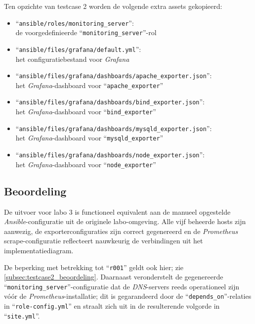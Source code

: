 Ten opzichte van testcase 2 worden de volgende extra assets gekopieerd:

\begin{itemize}
    \item ``\texttt{ansible/roles/monitoring\_server}'': \\de voorgedefinieerde ``\texttt{monitoring\_server}''-rol
    \item ``\texttt{ansible/files/grafana/default.yml}'': \\het configuratiebestand voor \emph{Grafana}
    \item ``\texttt{ansible/files/grafana/dashboards/apache\_exporter.json}'': \\het \emph{Grafana}-dashboard voor ``\texttt{apache\_exporter}''
    \item ``\texttt{ansible/files/grafana/dashboards/bind\_exporter.json}'': \\het \emph{Grafana}-dashboard voor ``\texttt{bind\_exporter}''
    \item ``\texttt{ansible/files/grafana/dashboards/mysqld\_exporter.json}'': \\het \emph{Grafana}-dashboard voor ``\texttt{mysqld\_exporter}''
    \item ``\texttt{ansible/files/grafana/dashboards/node\_exporter.json}'': \\het \emph{Grafana}-dashboard voor ``\texttt{node\_exporter}''
\end{itemize}

\subsection{Beoordeling}%
\label{subsec:testcase3_beoordeling}

De uitvoer voor labo 3 is functioneel equivalent aan de manueel opgestelde \emph{Ansible}-configuratie uit de originele labo-omgeving. Alle vijf beheerde hosts zijn aanwezig, de exporterconfiguraties zijn correct gegenereerd en de \emph{Prometheus} scrape-configuratie reflecteert nauwkeurig de verbindingen uit het implementatiediagram.

De beperking met betrekking tot ``\texttt{r001}'' geldt ook hier; zie \autoref{subsec:testcase2_beoordeling}. Daarnaast veronderstelt de gegenereerde ``\texttt{monitoring\_server}''-configuratie dat de \emph{DNS}-servers reeds operationeel zijn vóór de \emph{Prometheus}-installatie; dit is gegarandeerd door de ``\texttt{depends\_on}''-relaties in ``\texttt{role-config.yml}'' en straalt zich uit in de resulterende volgorde in ``\texttt{site.yml}''.